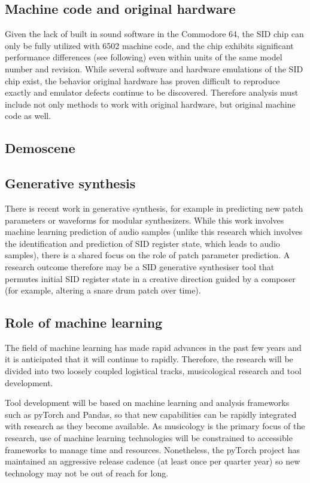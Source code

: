 \documentclass[10pt]{article}
\begin{document}
\begin{multicols*}{2}
  \subsection{Machine code and original hardware}
  Given the lack of built in sound software in the Commodore 64, the
  SID chip can only be fully utilized with 6502 machine code, and the
  chip exhibits significant performance differences (see following)
  even within units of the same model number and revision.  While
  several software and hardware emulations of the SID chip exist, the
  behavior original hardware has proven difficult to reproduce exactly
  and emulator defects continue to be discovered.  Therefore analysis
  must include not only methods to work with original hardware, but
  original machine code as well.

  \subsection{Demoscene}

  \subsection{Generative synthesis}
  There is recent work in generative synthesis, for example in
  predicting new patch parameters or waveforms for modular
  synthesizers.  While this work involves machine learning prediction
  of audio samples (unlike this research which involves the
  identification and prediction of SID register state, which leads to
  audio samples), there is a shared focus on the role of patch
  parameter prediction.  A research outcome therefore may be
  a SID generative synthesiser tool that permutes initial
  SID register state in a creative direction guided by a composer
  (for example, altering a snare drum patch over time).

  \subsection{Role of machine learning}
  The field of machine learning has made rapid advances in the past
  few years and it is anticipated that it will continue to
  rapidly. Therefore, the research will be divided into two loosely
  coupled logistical tracks, musicological research and tool
  development.

  Tool development will be based on machine learning and
  analysis frameworks such as pyTorch and Pandas, so that new
  capabilities can be rapidly integrated with research as they become
  available. As musicology is the primary focus of the research,
  use of machine learning technologies will be constrained to
  accessible frameworks to manage time and resources. Nonetheless,
  the pyTorch project has maintained an aggressive release cadence
  (at least once per quarter year) so new technology may not
  be out of reach for long.


\end{multicols*}
\end{document}
